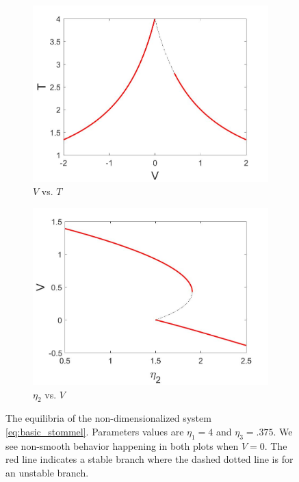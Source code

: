 \begin{figure}[H]
\centering
\begin{subfigure}{.5\textwidth}
  \centering
  \includegraphics[width=\linewidth]{intro/T_equil.jpg}
  \caption{$V$ vs. $T$}
  \label{fig:Tequil}
\end{subfigure}%
\begin{subfigure}{.5\textwidth}
  \centering
  \includegraphics[width=\linewidth]{intro/V_bif.jpg}
  \caption{$\eta_2$ vs. $V$}
  \label{fig:Vbif}
\end{subfigure}
\caption{The equilibria of the non-dimensionalized system \eqref{eq:basic_stommel}. Parameters values are $\eta_1=4$ and $\eta_3=.375$. We see non-smooth behavior happening in both plots when $V=0$. The red line indicates a stable branch where the dashed dotted line is for an unstable branch.}
\label{fig:systemequil}
\end{figure}

